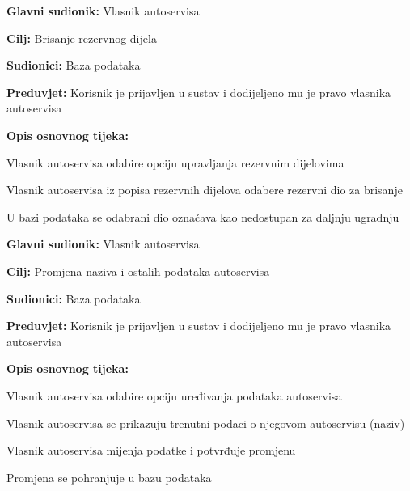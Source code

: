 \noindent {}
\begin{packed_item}
	
	\item \textbf{Glavni sudionik: } Vlasnik autoservisa
	\item  \textbf{Cilj:} Brisanje rezervnog dijela
	\item  \textbf{Sudionici:} Baza podataka
	\item  \textbf{Preduvjet:} Korisnik je prijavljen u sustav i dodijeljeno
	mu je pravo vlasnika autoservisa
	\item  \textbf{Opis osnovnog tijeka:}
	
	\item[] \begin{packed_enum}
		
		\item Vlasnik autoservisa odabire opciju upravljanja rezervnim dijelovima
		\item Vlasnik autoservisa iz popisa rezervnih dijelova odabere rezervni
		dio za brisanje
		\item U bazi podataka se odabrani dio označava kao nedostupan za daljnju
		ugradnju
		
	\end{packed_enum}
\end{packed_item}

\noindent {}
\begin{packed_item}
	
	\item \textbf{Glavni sudionik: } Vlasnik autoservisa
	\item  \textbf{Cilj:} Promjena naziva i ostalih podataka autoservisa
	\item  \textbf{Sudionici:} Baza podataka
	\item  \textbf{Preduvjet:} Korisnik je prijavljen u sustav i dodijeljeno
	mu je pravo vlasnika autoservisa
	\item  \textbf{Opis osnovnog tijeka:}
	
	\item[] \begin{packed_enum}
		
		\item Vlasnik autoservisa odabire opciju uređivanja podataka autoservisa
		\item Vlasnik autoservisa se prikazuju trenutni podaci o njegovom
		autoservisu (naziv)
		\item Vlasnik autoservisa mijenja podatke i potvrđuje promjenu
		\item Promjena se pohranjuje u bazu podataka
		
	\end{packed_enum}
\end{packed_item}

